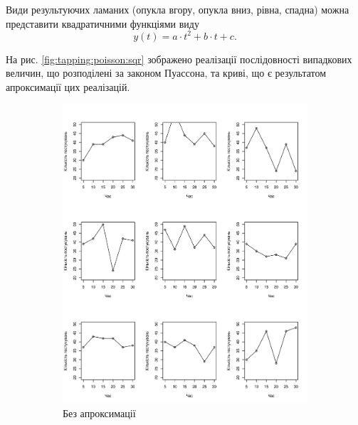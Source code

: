 Види результуючих ламаних (опукла вгору, опукла вниз, рівна, спадна) можна
представити квадратичними функціями виду
\begin{equation*}
  y\left( t \right) = a \cdot t^2 + b \cdot t + c.
\end{equation*}

На рис. \ref{fig:tapping:poisson:sqr} зображено реалізації послідовності
випадкових величин, що розподілені за законом Пуассона, та криві, що є
результатом апроксимації цих реалізацій.

\begin{figure}[h]
  \centering
  \begin{subfigure}[b]{0.45\textwidth}
    \includegraphics[width=\textwidth]{images/poisson}
    \caption{Без апроксимації}
    \label{fig:tapping:poisson}
  \end{subfigure}
  \begin{subfigure}[b]{0.45\textwidth}

\end{subfigure}
\end{figure}
